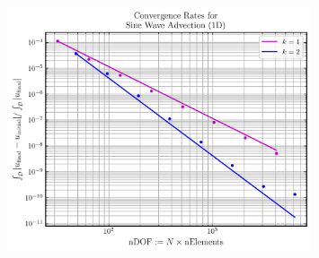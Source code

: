 \documentclass{beamer}
\begin{document}
\begin{frame}

  \begin{figure}[htb!]
    \centering
    \includegraphics[width=0.8\textwidth]{fig.ConvergenceRates.png}
  \end{figure}

\end{frame}
\end{document}
